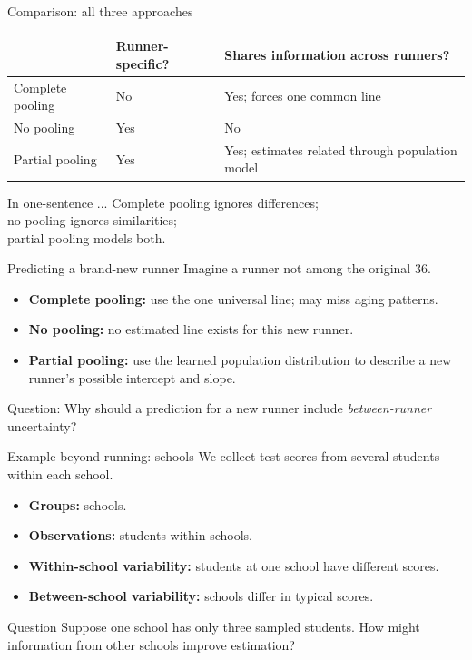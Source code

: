 \documentclass[aspectratio=43,11pt]{beamer}
\begin{document}
\begin{frame}{Comparison: all three approaches}
\small
\begin{tabular}{p{2.7cm}p{2.4cm}p{4.4cm}}
\toprule
 & Runner-specific? & Shares information across runners?\\\midrule
Complete pooling & No & Yes; forces one common line\\[2mm]
No pooling & Yes & No\\[2mm]
Partial pooling & Yes & Yes; estimates related through population model\\
\bottomrule
\end{tabular}
\vspace{7mm}
\begin{block}{In one-sentence ...}
Complete pooling ignores differences;\\
\qquad no pooling ignores similarities;\\
\qquad \qquad partial pooling models both.
\end{block}
\end{frame}

\begin{frame}{Predicting a brand-new runner}
Imagine a runner not among the original 36.
\begin{itemize}
\item \textbf{Complete pooling:} use the one universal line; may miss aging patterns.
\item \textbf{No pooling:} no estimated line exists for this new runner.
\item \textbf{Partial pooling:} use the learned population distribution to describe a new runner's possible intercept and slope.
\end{itemize}
\begin{block}{Question:}
Why should a prediction for a new runner include \emph{between-runner} uncertainty?
\end{block}
\end{frame}

\begin{frame}{Example beyond running: schools}
We collect test scores from several students within each school.
\begin{itemize}
\item \textbf{Groups:} schools.
\item \textbf{Observations:} students within schools.
\item \textbf{Within-school variability:} students at one school have different scores.
\item \textbf{Between-school variability:} schools differ in typical scores.
\end{itemize}
\begin{block}{Question}
Suppose one school has only three sampled students. How might information from other schools improve estimation?
\end{block}
\end{frame}
\end{document}
